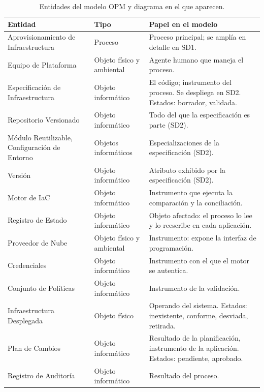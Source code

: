\documentclass[11pt,letterpaper]{article}
\begin{document}
\begin{table}[htbp]
  \centering
  \scriptsize
  \caption{Entidades del modelo OPM y diagrama en el que aparecen.}
  \label{tab:entidades}
  \begin{tabularx}{\textwidth}{@{}>{\raggedright\arraybackslash}p{}
    >{\raggedright\arraybackslash}p{}
    >{\raggedright\arraybackslash}X@{}}
    \toprule
    \textbf{Entidad} & \textbf{Tipo} & \textbf{Papel en el modelo} \\
    \midrule
    Aprovisionamiento de Infraestructura & Proceso & Proceso principal; se
      amplía en detalle en SD1. \\
    Equipo de Plataforma & Objeto físico y ambiental & Agente humano que
      maneja el proceso. \\
    Especificación de Infraestructura & Objeto informático & El código;
      instrumento del proceso. Se despliega en SD2. Estados: borrador,
      validada. \\
    Repositorio Versionado & Objeto informático & Todo del que la
      especificación es parte (SD2). \\
    Módulo Reutilizable, Configuración de Entorno & Objetos informáticos &
      Especializaciones de la especificación (SD2). \\
    Versión & Objeto informático & Atributo exhibido por la especificación
      (SD2). \\
    Motor de IaC & Objeto informático & Instrumento que ejecuta la
      comparación y la conciliación. \\
    Registro de Estado & Objeto informático & Objeto afectado: el proceso lo
      lee y lo reescribe en cada aplicación. \\
    Proveedor de Nube & Objeto físico y ambiental & Instrumento: expone la
      interfaz de programación. \\
    Credenciales & Objeto informático & Instrumento con el que el motor se
      autentica. \\
    Conjunto de Políticas & Objeto informático & Instrumento de la
      validación. \\
    Infraestructura Desplegada & Objeto físico & Operando del sistema.
      Estados: inexistente, conforme, desviada, retirada. \\
    Plan de Cambios & Objeto informático & Resultado de la planificación,
      instrumento de la aplicación. Estados: pendiente, aprobado. \\
    Registro de Auditoría & Objeto informático & Resultado del proceso. \\
    \bottomrule
  \end{tabularx}
\end{table}
\end{document}
